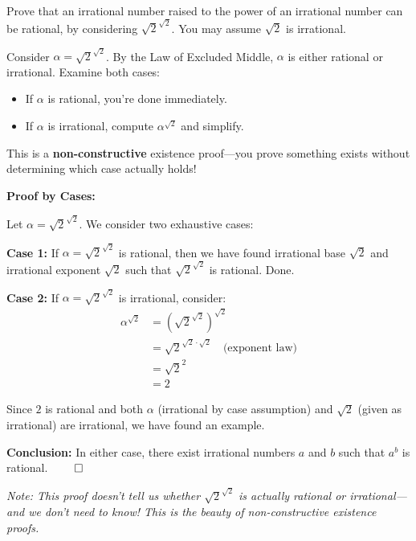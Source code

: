 
\begin{problem}
Prove that an irrational number raised to the power of an irrational number can be rational, by considering $\sqrt{2}^{\sqrt{2}}$. You may assume $\sqrt{2}$ is irrational.
\end{problem}

\begin{hint}
Consider $\alpha = \sqrt{2}^{\sqrt{2}}$. By the Law of Excluded Middle, $\alpha$ is either rational or irrational. Examine both cases:
\begin{itemize}
\item If $\alpha$ is rational, you're done immediately.
\item If $\alpha$ is irrational, compute $\alpha^{\sqrt{2}}$ and simplify.
\end{itemize}

This is a \textbf{non-constructive} existence proof---you prove something exists without determining which case actually holds!
\end{hint}

\begin{solution}
\textbf{Proof by Cases:}

Let $\alpha = \sqrt{2}^{\sqrt{2}}$. We consider two exhaustive cases:

\vspace{0.3cm}

\textbf{Case 1:} If $\alpha = \sqrt{2}^{\sqrt{2}}$ is rational, then we have found irrational base $\sqrt{2}$ and irrational exponent $\sqrt{2}$ such that $\sqrt{2}^{\sqrt{2}}$ is rational. Done.

\vspace{0.3cm}

\textbf{Case 2:} If $\alpha = \sqrt{2}^{\sqrt{2}}$ is irrational, consider:
\begin{align*}
\alpha^{\sqrt{2}} &= \left(\sqrt{2}^{\sqrt{2}}\right)^{\sqrt{2}} \\
&= \sqrt{2}^{\sqrt{2} \cdot \sqrt{2}} \quad \text{(exponent law)} \\
&= \sqrt{2}^{2} \\
&= 2
\end{align*}

Since $2$ is rational and both $\alpha$ (irrational by case assumption) and $\sqrt{2}$ (given as irrational) are irrational, we have found an example.

\vspace{0.3cm}

\textbf{Conclusion:} In either case, there exist irrational numbers $a$ and $b$ such that $a^b$ is rational. $\qed$

\vspace{0.3cm}

\textit{Note: This proof doesn't tell us whether $\sqrt{2}^{\sqrt{2}}$ is actually rational or irrational---and we don't need to know! This is the beauty of non-constructive existence proofs.}
\end{solution}

